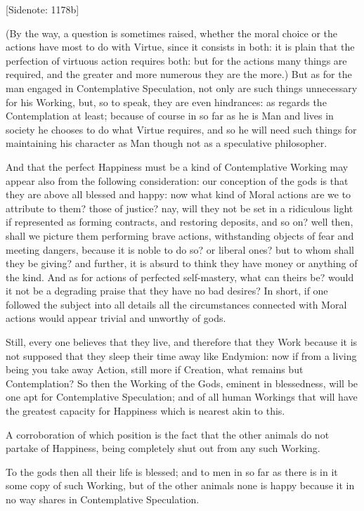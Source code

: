 [Sidenote: 1178b]

(By the way, a question is sometimes raised, whether the moral choice or
the actions have most to do with Virtue, since it consists in both: it
is plain that the perfection of virtuous action requires both: but for
the actions many things are required, and the greater and more numerous
they are the more.) But as for the man engaged in Contemplative
Speculation, not only are such things unnecessary for his Working, but,
so to speak, they are even hindrances: as regards the Contemplation at
least; because of course in so far as he is Man and lives in society he
chooses to do what Virtue requires, and so he will need such things
for maintaining his character as Man though not as a speculative
philosopher.

And that the perfect Happiness must be a kind of Contemplative Working
may appear also from the following consideration: our conception of the
gods is that they are above all blessed and happy: now what kind of
Moral actions are we to attribute to them? those of justice? nay,
will they not be set in a ridiculous light if represented as forming
contracts, and restoring deposits, and so on? well then, shall we
picture them performing brave actions, withstanding objects of fear and
meeting dangers, because it is noble to do so? or liberal ones? but to
whom shall they be giving? and further, it is absurd to think they have
money or anything of the kind. And as for actions of perfected
self-mastery, what can theirs be? would it not be a degrading praise
that they have no bad desires? In short, if one followed the subject
into all details all the circumstances connected with Moral actions
would appear trivial and unworthy of gods.

Still, every one believes that they live, and therefore that they
Work because it is not supposed that they sleep their time away like
Endymion: now if from a living being you take away Action, still more
if Creation, what remains but Contemplation? So then the Working of
the Gods, eminent in blessedness, will be one apt for Contemplative
Speculation; and of all human Workings that will have the greatest
capacity for Happiness which is nearest akin to this.

A corroboration of which position is the fact that the other animals
do not partake of Happiness, being completely shut out from any such
Working.

To the gods then all their life is blessed; and to men in so far as
there is in it some copy of such Working, but of the other animals none
is happy because it in no way shares in Contemplative Speculation.


